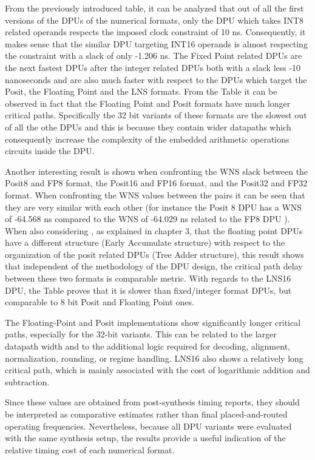 From the previously introduced table, it can be analyzed that out of all the first versions of the DPUs of the numerical formats, only the DPU which takes INT8 related operands respects the imposed clock constraint of 10 ns. Consequently, it makes sense that the similar DPU targeting INT16 operands is almost respecting the constraint with a slack of only -1.206 ns. The Fixed Point related DPUs are the next fastest DPUs after the integer related DPUs both with a slack less  -10 nanoseconds and are also much faster with respect to the DPUs which target the Posit, the Floating Point and the LNS formats. From the Table it can be observed in fact that the Floating Point and Posit formats have much longer critical paths. Specifically the 32 bit variants of these formats are the slowest out of all the othe DPUs and this is because they contain wider datapaths which consequently increase the complexity of the embedded arithmetic operations  circuits inside the DPU.

Another interesting result is shown when confronting the WNS slack between the Posit8 and FP8 format, the Posit16 and FP16 format, and the Posit32 and FP32 format. When confronting the WNS values between the pairs it can be seen that they are very similar with each other (for instance the Posit 8 DPU has a WNS of -64.568 ns compared to the WNS of -64.029 ns related to the FP8 DPU ). When also considering , as explained in chapter 3, that the floating point DPUs have a different structure (Early Accumulate structure) with respect to the organization of the posit related DPUs (Tree Adder structure), this result shows that independent of the methodology of the DPU design, the critical path delay between these two formats is comparable metric. With regards to the LNS16 DPU, the Table proves that it is slower than fixed/integer format DPUs, but comparable to 8 bit Posit and Floating Point ones.


The Floating-Point and Posit implementations show significantly longer critical paths, especially for the 32-bit variants. This can be related to the larger datapath width and to the additional logic required for decoding, alignment, normalization, rounding, or regime handling. LNS16 also shows a relatively long critical path, which is mainly associated with the cost of logarithmic addition and subtraction. 

Since these values are obtained from post-synthesis timing reports, they should be interpreted as comparative estimates rather than final placed-and-routed operating frequencies. Nevertheless, because all DPU variants were evaluated with the same synthesis setup, the results provide a useful indication of the relative timing cost of each numerical format.


